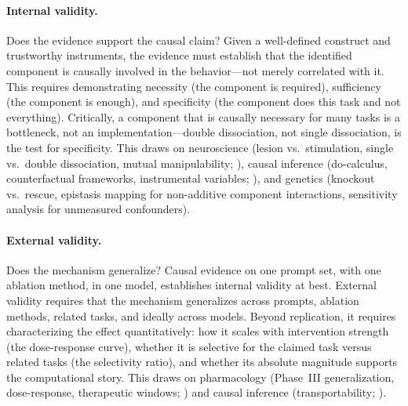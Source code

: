 \documentclass{article}
\begin{document}
\paragraph{Internal validity.} Does the evidence support the causal claim? Given a well-defined construct and trustworthy instruments, the evidence must establish that the identified component is causally involved in the behavior---not merely correlated with it. This requires demonstrating necessity (the component is required), sufficiency (the component is enough), and specificity (the component does this task and not everything). Critically, a component that is causally necessary for many tasks is a bottleneck, not an implementation---double dissociation, not single dissociation, is the test for specificity. This draws on neuroscience (lesion vs.\ stimulation, single vs.\ double dissociation, mutual manipulability; \citealp{shallice1988neuropsychology, craver2007explaining}), causal inference (do-calculus, counterfactual frameworks, instrumental variables; \citealp{pearl2009causality}), and genetics (knockout vs.\ rescue, epistasis mapping for non-additive component interactions, sensitivity analysis for unmeasured confounders).

\paragraph{External validity.} Does the mechanism generalize? Causal evidence on one prompt set, with one ablation method, in one model, establishes internal validity at best. External validity requires that the mechanism generalizes across prompts, ablation methods, related tasks, and ideally across models. Beyond replication, it requires characterizing the effect quantitatively: how it scales with intervention strength (the dose-response curve), whether it is selective for the claimed task versus related tasks (the selectivity ratio), and whether its absolute magnitude supports the computational story. This draws on pharmacology (Phase~III generalization, dose-response, therapeutic windows; \citealp{rang2006drug}) and causal inference (transportability; \citealp{pearl2011transportability}).
\end{document}
